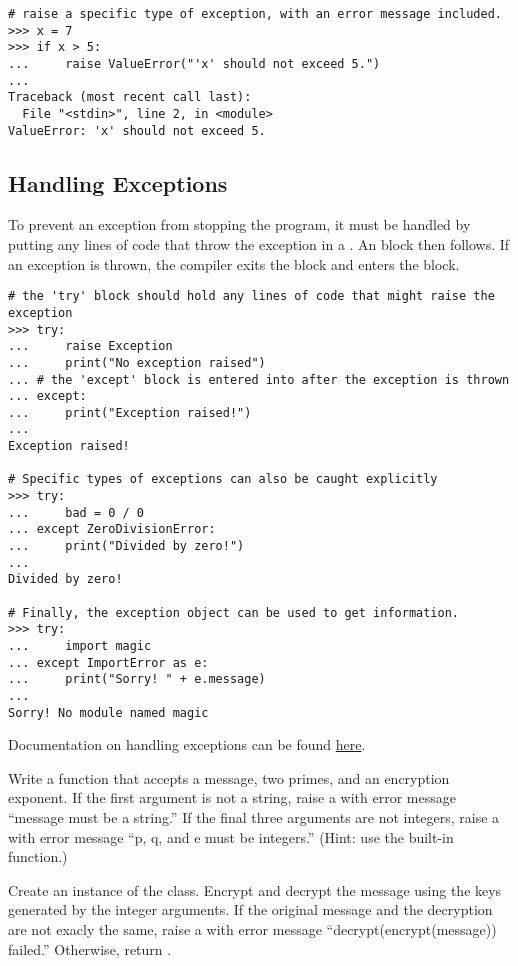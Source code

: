\begin{lstlisting}
# raise a specific type of exception, with an error message included.
>>> x = 7
>>> if x > 5:
...     raise ValueError("'x' should not exceed 5.")
... 
Traceback (most recent call last):
  File "<stdin>", line 2, in <module>
ValueError: 'x' should not exceed 5.
\end{lstlisting}

\subsection*{Handling Exceptions}

To prevent an exception from stopping the program, it must be handled by
putting any lines of code that throw the exception in a .
An  block then follows.
If an exception is thrown, the compiler exits the  block and enters the  block.

\begin{lstlisting}
# the 'try' block should hold any lines of code that might raise the exception
>>> try:
...     raise Exception
...     print("No exception raised")
... # the 'except' block is entered into after the exception is thrown
... except:
...     print("Exception raised!")
... 
Exception raised!

# Specific types of exceptions can also be caught explicitly
>>> try:
...     bad = 0 / 0
... except ZeroDivisionError:
...     print("Divided by zero!")
... 
Divided by zero!

# Finally, the exception object can be used to get information.
>>> try:
...     import magic
... except ImportError as e:
...     print("Sorry! " + e.message)
... 
Sorry! No module named magic
\end{lstlisting}

Documentation on handling exceptions can be found \href{https://docs.python.org/2/tutorial/errors.html}{here}.

\begin{problem}
Write a  function that accepts a message, two primes, and an encryption exponent.
If the first argument is not a string, raise a  with error message ``message must be a string.''
If the final three arguments are not integers, raise a  with error message ``p, q, and e must be integers.''
(Hint: use the built-in  function.)

Create an instance of the  class.
Encrypt and decrypt the message using the keys generated by the integer arguments.
If the original message and the decryption are not exacly the same, raise a  with error message ``decrypt(encrypt(message)) failed.''
Otherwise, return .
\end{problem}

